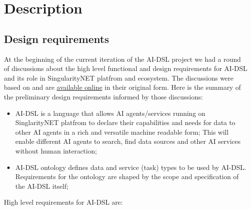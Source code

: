 \documentclass[]{report}
\begin{document}
\section{Description}

\subsection{Design requirements}

At the beginning of the current iteration of the AI-DSL project we had a round of discussions about the high level functional and design requirements for AI-DSL and its role in SingularityNET platfrom and ecosystem. The discussions were based on \cite{GoertzelGeisweillerBlog,singularitynet_foundation_phasetwo_2021}  and are \href{https://github.com/nunet-io/ai-dsl-ontology/wiki/AI-DSL\%20requirements}{available online} in their original form. Here is the summary of the preliminary design requirements informed by those discussions:

\begin{itemize}
  \item AI-DSL is a language that allows AI agents/services running on SinglarityNET platfrom to declare their capabilities and needs for data to other AI agents in a rich and versatile machine readable form; This will enable different AI agents to search, find data sources and other AI services without human interaction;
  \item AI-DSL ontology defines data and service (task) types to be used by AI-DSL. Requirements for the ontology are shaped by the scope and specification of the AI-DSL itself;
\end{itemize}

High level requirements for AI-DSL are:
\end{document}
